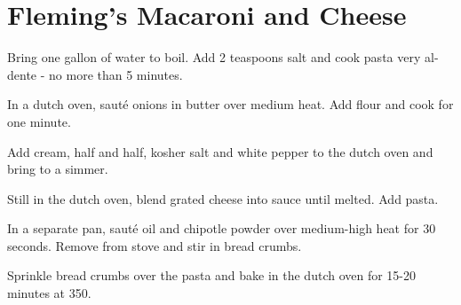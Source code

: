 
\section{Fleming's Macaroni and Cheese}
\begin{recipe}



Bring one gallon of water to boil. Add 2 teaspoons salt and cook pasta very al-dente - no more than 5 minutes.


In a dutch oven, sauté onions in butter over medium heat. Add flour and cook for one minute.


Add cream, half and half, kosher salt and white pepper to the dutch oven and bring to a simmer.


Still in the dutch oven, blend grated cheese into sauce until melted. Add pasta.


In a separate pan, sauté oil and chipotle powder over medium-high heat for 30 seconds. Remove from stove and stir in bread crumbs.

Sprinkle bread crumbs over the pasta and bake in the dutch oven for 15-20 minutes at 350\degree{}.

\end{recipe}
